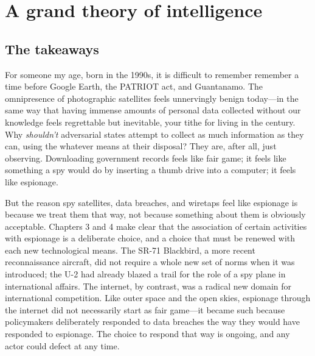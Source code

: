 \documentclass{memoir}
\begin{document}
\section{A grand theory of intelligence}
\subsection{The takeaways}

For someone my age, born in the 1990s, it is difficult to remember remember a time before Google Earth, the PATRIOT act, and Guantanamo. The omnipresence of photographic satellites feels unnervingly benign today---in the same way that having immense amounts of personal data collected without our knowledge feels regrettable but inevitable, your tithe for living in the  century. Why \emph{shouldn't} adversarial states attempt to collect as much information as they can, using the whatever means at their disposal? They are, after all, just observing. Downloading government records feels like fair game; it feels like something a spy would do by inserting a thumb drive into a computer; it feels like espionage.

But the reason spy satellites, data breaches, and wiretaps feel like espionage is because we treat them that way, not because something about them is obviously acceptable. Chapters 3 and 4 make clear that the association of certain activities with espionage is a deliberate choice, and a choice that must be renewed with each new technological means. The SR-71 Blackbird, a more recent reconnaissance aircraft, did not require a whole new set of norms when it was introduced; the U-2 had already blazed a trail for the role of a spy plane in international affairs. The internet, by contrast, was a radical new domain for international competition. Like outer space and the open skies, espionage through the internet did not necessarily start as fair game---it became such because policymakers deliberately responded to data breaches the way they would have responded to espionage. The choice to respond that way is ongoing, and any actor could defect at any time.

\end{document}
